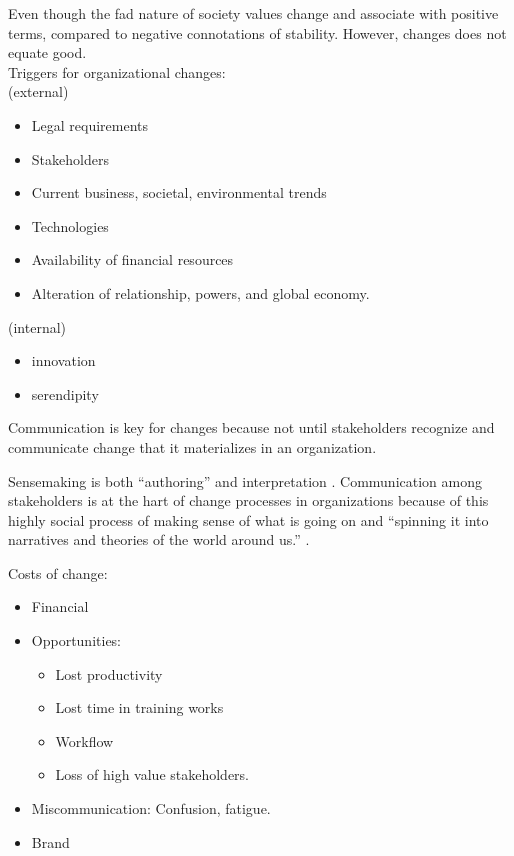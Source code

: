 \documentclass[
]{book}
\providecommand{\tightlist}{%
  \setlength{\itemsep}{0pt}\setlength{\parskip}{0pt}}
\begin{document}
Even though the fad nature of society values change and associate with positive terms, compared to negative connotations of stability. However, changes does not equate good.\\
Triggers for organizational changes:\\
(external)

\begin{itemize}
\tightlist
\item
  Legal requirements\\
\item
  Stakeholders\\
\item
  Current business, societal, environmental trends\\
\item
  Technologies\\
\item
  Availability of financial resources\\
\item
  Alteration of relationship, powers, and global economy.
\end{itemize}

(internal)

\begin{itemize}
\tightlist
\item
  innovation
\item
  serendipity
\end{itemize}

Communication is key for changes because not until stakeholders recognize and communicate change that it materializes in an organization.

Sensemaking is both ``authoring'' and interpretation \citep{Lewis_2019}. Communication among stakeholders is at the hart of change processes in organizations because of this highly social process of making sense of what is going on and ``spinning it into narratives and theories of the world around us.'' \citep{Lewis_2019}.

Costs of change:

\begin{itemize}
\item
  Financial\\
\item
  Opportunities:

  \begin{itemize}
  \tightlist
  \item
    Lost productivity\\
  \item
    Lost time in training works\\
  \item
    Workflow
  \item
    Loss of high value stakeholders.\\
  \end{itemize}
\item
  Miscommunication: Confusion, fatigue.\\
\item
  Brand
\end{itemize}
\end{document}
